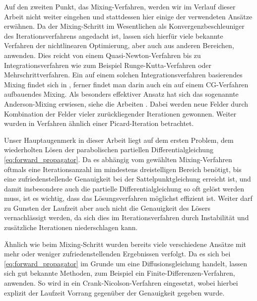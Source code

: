 \documentclass[../main.tex]{subfiles}
\begin{document}
%
Auf den zweiten Punkt, das Mixing-Verfahren, werden wir im Verlauf dieser Arbeit nicht weiter eingehen und stattdessen hier einige der verwendeten Ansätze erwähnen.
Da der Mixing-Schritt im Wesentlichen als Konvergenzbeschleuniger des Iterationsverfahrens angedacht ist, lassen sich hierfür viele bekannte Verfahren der nichtlinearen Optimierung, aber auch aus anderen Bereichen, anwenden.
Dies reicht von einem Quasi-Newton-Verfahren \cite{Matsen:1994bz} bis zu Integrationsverfahren wie zum Beispiel Runge-Kutta-Verfahren oder Mehrschrittverfahren.
Ein auf einem solchen Integrationsverfahren basierendes Mixing findet sich in \cite{Ceniceros:2006is}, ferner findet man darin auch ein auf einem CG-Verfahren aufbauendes Mixing.
Als besonders effektiver Ansatz hat sich das sogenannte Anderson-Mixing erwiesen, siehe die Arbeiten \cite{Thompson:2004um,Stasiak:2011ba}.
Dabei werden neue Felder durch Kombination der Felder vieler zurückliegender Iterationen gewonnen.
Weiter wurden in \cite{Drolet:1999bs} Verfahren ähnlich einer Picard-Iteration betrachtet.

Unser Hauptaugenmerk in dieser Arbeit liegt auf dem ersten Problem, dem wiederholten Lösen der parabolischen partiellen Differentialgleichung \cref{eq:forward_propagator}.
Da es abhängig vom gewählten Mixing-Verfahren oftmals eine Iterationsanzahl im mindestens dreistelligen Bereich benötigt, bis eine zufriedenstellende Genauigkeit bei der Sattelpunktgleichung erreicht ist, und damit insbesondere auch die partielle Differentialgleichung so oft gelöst werden muss, ist es wichtig, dass das Lösungsverfahren möglichst effizient ist.
Weiter darf zu Gunsten der Laufzeit aber auch nicht die Genauigkeit des Lösers vernachlässigt werden, da sich dies im Iterationsverfahren durch Instabilität und zusätzliche Iterationen niederschlagen kann.

Ähnlich wie beim Mixing-Schritt wurden bereits viele verschiedene Ansätze mit mehr oder weniger zufriedenstellenden Ergebnissen verfolgt.
Da es sich bei \cref{eq:forward_propagator} im Grunde um eine Diffusionsgleichung handelt, lassen sich gut bekannte Methoden, zum Beispiel ein Finite-Differenzen-Verfahren, anwenden.
So wird in \cite{Drolet:1999bs} ein Crank-Nicolson-Verfahren eingesetzt, wobei hierbei explizit der Laufzeit Vorrang gegenüber der Genauigkeit gegeben wurde.
\end{document}
